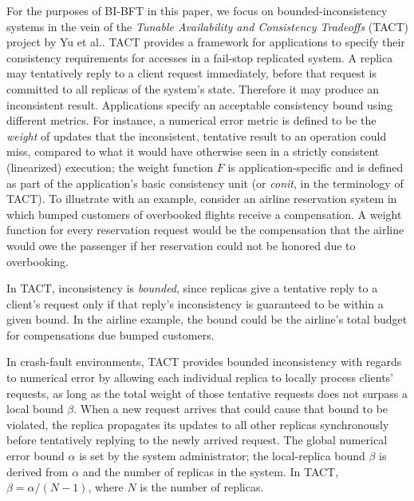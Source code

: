 \documentclass[twocolumn,10pt]{article}
\newcommand{\stitle}[1]{\vspace{2pt}{\bf #1:}}
\begin{document}
\stitle{TACT Background} For the purposes of BI-BFT in this paper, we
focus on bounded-inconsistency systems in the vein of the \emph{Tunable
Availability and Consistency Tradeoffs} (TACT) project by Yu et
al.\cite{Yu2002}.  TACT provides a framework for applications to specify
their consistency requirements for accesses in a fail-stop replicated system.  A
replica may tentatively reply to a client request immediately, before
that request is committed to all replicas of the system's
state. Therefore it may produce an inconsistent result.  Applications
specify an acceptable consistency bound using different metrics. For
instance, a numerical error metric is defined to be the \emph{weight} of
updates that the inconsistent, tentative result to an operation could
miss, compared to what it would have otherwise seen in a strictly consistent
(linearized) execution; the weight function $F$ is application-specific and
is defined as part of the application's basic consistency unit (or
\emph{conit}, in the terminology of TACT).  To illustrate with an example, consider an airline
reservation system in which bumped customers of overbooked flights
receive a compensation.  A weight function for every reservation request
would be the compensation that the airline would owe the passenger if her reservation
could not be honored due to overbooking.

In TACT, inconsistency is \emph{bounded}, since replicas give a
tentative reply to a client's request only if that reply's
inconsistency is guaranteed to be within a given bound.  In the
airline example, the bound could be the airline's total budget for
compensations due bumped customers.

In crash-fault environments, TACT provides bounded inconsistency with regards to
numerical error by allowing each individual replica to locally process clients' requests, as
long as the total weight of those tentative requests does not surpass a local bound
$\beta$. When a new request arrives that could cause that bound to be
violated, the replica propagates its updates to all other replicas
synchronously before tentatively replying to the newly arrived
request.  The global numerical error bound $\alpha$ is set by the
system administrator; the local-replica bound $\beta$ is derived from
$\alpha$ and the number of replicas in the system. In TACT, $\beta=\alpha/(N-1)$, where
$N$ is the number of replicas.
\end{document}
